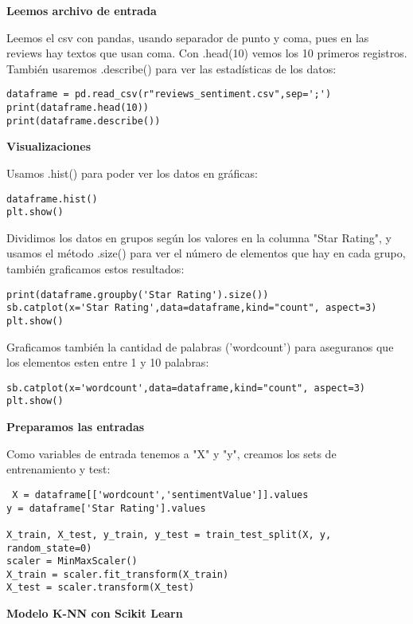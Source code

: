 \documentclass{article}
\begin{document}
\textbf{Leemos archivo de entrada}



Leemos el csv con pandas, usando separador de punto y coma, pues en las reviews
hay textos que usan coma. Con .head(10) vemos los 10 primeros registros. También usaremos .describe() para ver las estadísticas de los datos:
\begin{lstlisting}
dataframe = pd.read_csv(r"reviews_sentiment.csv",sep=';')
print(dataframe.head(10))
print(dataframe.describe())
\end{lstlisting}




\textbf{Visualizaciones}




Usamos .hist() para poder ver los datos en gráficas:
\begin{lstlisting}
dataframe.hist()
plt.show()
\end{lstlisting}


Dividimos los datos en grupos según los valores en la columna "Star Rating", y usamos el método .size() para ver el número de elementos que hay en cada grupo, también graficamos estos resultados:
\begin{lstlisting}
print(dataframe.groupby('Star Rating').size())
sb.catplot(x='Star Rating',data=dataframe,kind="count", aspect=3)
plt.show()
\end{lstlisting}

Graficamos también la cantidad de palabras ('wordcount') para aseguranos que los elementos esten entre 1 y 10 palabras:
\begin{lstlisting}
sb.catplot(x='wordcount',data=dataframe,kind="count", aspect=3)
plt.show()
\end{lstlisting}




\textbf{Preparamos las entradas}



Como variables de entrada tenemos a "X" y "y", creamos los sets de entrenamiento y test:
\begin{lstlisting}
 X = dataframe[['wordcount','sentimentValue']].values
y = dataframe['Star Rating'].values

X_train, X_test, y_train, y_test = train_test_split(X, y, random_state=0)
scaler = MinMaxScaler()
X_train = scaler.fit_transform(X_train)
X_test = scaler.transform(X_test)
\end{lstlisting}




\textbf{Modelo K-NN con Scikit Learn}
\end{document}
